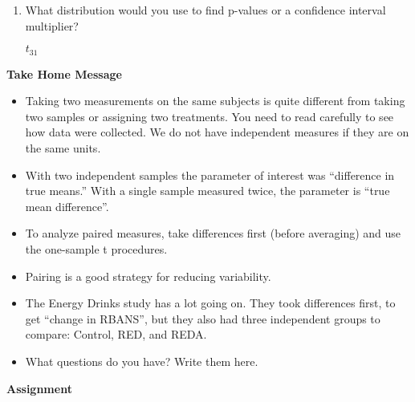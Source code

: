 \begin{enumerate}
\begin{enumerate}
\begin{key}
  {\it Take difference in weight gain (diet minus sugar) for each person.}
\end{key}
\item What distribution would you use to find p-values or
    a confidence interval multiplier?
\begin{students}
\vspace{2cm}\newpage
\end{students}

\begin{key}
  {\it $t_{31}$}
\end{key}
\end{enumerate}

\end{enumerate}


\begin{center}
  {\large\bf Take Home Message}
\end{center}
\begin{itemize}
\item Taking two measurements on the same subjects is quite different
  from taking two samples or assigning two treatments. You need to
  read carefully to see how data were collected.  We do not have
  independent measures if they are on the same units.

  \item With two independent samples the parameter of interest was
    ``difference in true means.''  With a single sample measured
    twice, the parameter is ``true mean difference''.

  \item To analyze paired measures, take differences first (before
    averaging) and use the one-sample t procedures.

  \item Pairing is a good strategy for reducing variability.

  \item The Energy Drinks study has a lot going on.  They took
    differences first, to get ``change in RBANS'', but they also had
    three independent groups to compare: Control, RED, and REDA.

  \item What  questions do you have?  Write them here.\vfill
\end{itemize}



\begin{center}
  {\large\bf Assignment}
\end{center}

